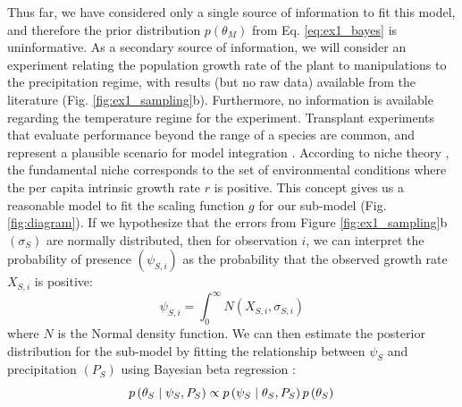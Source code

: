 Thus far, we have considered only a single source of information to fit this model, and therefore the prior distribution \(p\left(\theta_M \right)\) from Eq. \ref{eq:ex1_bayes} is uninformative.
As a secondary source of information, we will consider an experiment relating the population growth rate of the plant to manipulations to the precipitation regime, with results (but no raw data) available from the literature (Fig. \ref{fig:ex1_sampling}b). 
Furthermore, no information is available regarding the temperature regime for the experiment.
Transplant experiments that evaluate performance beyond the range of a species are common, and represent a plausible scenario for model integration \citep{Hargreaves2014}.
According to niche theory \citep{Holt2009}, the fundamental niche corresponds to the set of environmental conditions where the per capita intrinsic growth rate $r$ is positive.
This concept gives us a reasonable model to fit the scaling function $g$ for our sub-model (Fig. \ref{fig:diagram}).
If we hypothesize that the errors from Figure \ref{fig:ex1_sampling}b \( \left(\sigma_{S} \right) \) are normally distributed, then for observation $i$, we can interpret the probability of presence \( \left(\psi_{S,i}\right)\) as the probability that the observed growth rate \(X_{S,i}\) is positive:
\begin{equation}
	\psi_{S,i} = \int_0^\infty N \left(X_{S,i}, \sigma_{S,i} \right)
\end{equation}
where \(N\) is the Normal density function.
We can then estimate the posterior distribution for the sub-model by fitting the relationship between \(\psi_S\) and precipitation \( \left( P_S \right) \) using Bayesian beta regression \citep{Ferrari2004}:
\begin{equation}
\label{eq:ex1_thetas}
	p\left (\theta_S \mid \psi_S,P_S \right ) \propto 
	p \left(\psi_S \mid \theta_S, P_S \right)
	p \left(\theta_S \right) \\
\end{equation}

